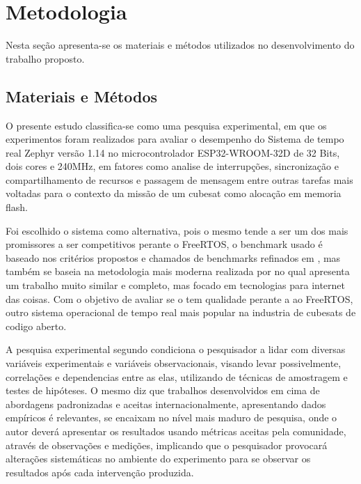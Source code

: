 

\chapter{Metodologia}\label{cap:metodologia}
Nesta seção apresenta-se os materiais e métodos utilizados no desenvolvimento do trabalho proposto.
\section{Materiais e Métodos}

O presente estudo classifica-se como uma pesquisa experimental, em que os experimentos foram realizados
para avaliar o desempenho do Sistema de tempo real Zephyr\cite{Zephyr}
versão 1.14 no microcontrolador ESP32-WROOM-32D de 32 Bits, dois cores e 240MHz, em fatores como analise
de interrupções, sincronização e compartilhamento de recursos e passagem de mensagem
entre outras tarefas mais voltadas para o contexto da missão de um cubesat como alocação em memoria flash.

Foi escolhido o sistema \cite{Zephyr} como alternativa, pois o
mesmo tende a ser um dos mais promissores a ser competitivos perante o FreeRTOS, o benchmark usado é
baseado nos critérios propostos e chamados de benchmarks refinados em \cite{Garcia}, mas também se baseia
na metodologia mais moderna realizada por \cite{Raymundo} no qual apresenta um trabalho muito similar e
completo, mas focado em tecnologias para internet das coisas. Com o objetivo de avaliar se o \cite{Zephyr}
tem qualidade perante a ao FreeRTOS, outro sistema operacional de tempo real mais popular na industria de
cubesats de codigo aberto.

A pesquisa experimental segundo \cite{wazlawick2017metodologia} condiciona o pesquisador a lidar com
diversas variáveis experimentais e variáveis observacionais, visando levar possivelmente, correlações
e dependencias entre as elas, utilizando de técnicas de amostragem e testes de hipóteses.
O mesmo diz que trabalhos desenvolvidos em cima de abordagens padronizadas e
aceitas internacionalmente, apresentando dados empíricos é relevantes, se encaixam no nível mais maduro
de pesquisa, onde o autor deverá apresentar os resultados usando métricas aceitas pela
comunidade, através de observações e medições, implicando que o pesquisador provocará alterações sistemáticas
no ambiente do experimento para se observar os resultados após cada intervenção produzida.

